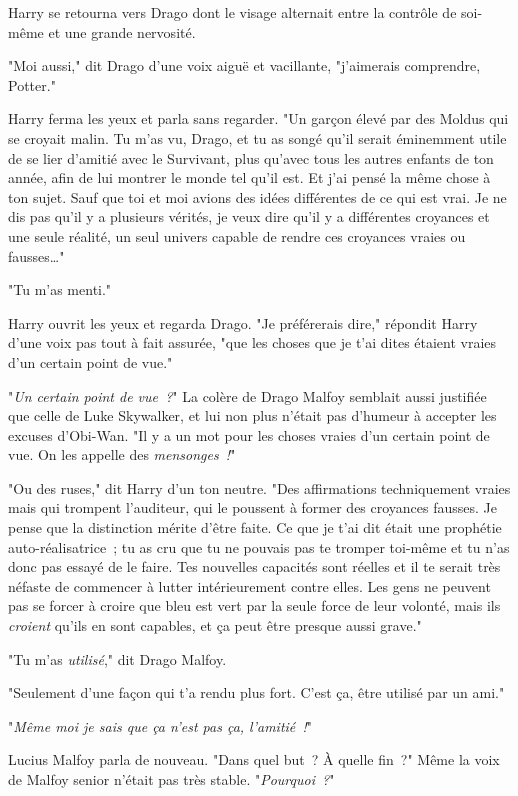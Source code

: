 Harry se retourna vers Drago dont le visage alternait entre la contrôle de soi-même et une grande nervosité.

"Moi aussi," dit Drago d'une voix aiguë et vacillante, "j'aimerais comprendre, Potter."

Harry ferma les yeux et parla sans regarder. "Un garçon élevé par des Moldus qui se croyait malin. Tu m'as vu, Drago, et tu as songé qu'il serait éminemment utile de se lier d'amitié avec le Survivant, plus qu'avec tous les autres enfants de ton année, afin de lui montrer le monde tel qu'il est. Et j'ai pensé la même chose à ton sujet. Sauf que toi et moi avions des idées différentes de ce qui est vrai. Je ne dis pas qu'il y a plusieurs vérités, je veux dire qu'il y a différentes croyances et une seule réalité, un seul univers capable de rendre ces croyances vraies ou fausses…"

"Tu m'as menti."

Harry ouvrit les yeux et regarda Drago. "Je préférerais dire," répondit Harry d'une voix pas tout à fait assurée, "que les choses que je t'ai dites étaient vraies d'un certain point de vue."

"\emph{Un certain point de vue~?}" La colère de Drago Malfoy semblait aussi justifiée que celle de Luke Skywalker, et lui non plus n'était pas d'humeur à accepter les excuses d'Obi-Wan. "Il y a un mot pour les choses vraies d'un certain point de vue. On les appelle des \emph{mensonges~!}"

"Ou des ruses," dit Harry d'un ton neutre. "Des affirmations techniquement vraies mais qui trompent l'auditeur, qui le poussent à former des croyances fausses. Je pense que la distinction mérite d'être faite. Ce que je t'ai dit était une prophétie auto-réalisatrice~; tu as cru que tu ne pouvais pas te tromper toi-même et tu n'as donc pas essayé de le faire. Tes nouvelles capacités sont réelles et il te serait très néfaste de commencer à lutter intérieurement contre elles. Les gens ne peuvent pas se forcer à croire que bleu est vert par la seule force de leur volonté, mais ils \emph{croient} qu'ils en sont capables, et ça peut être presque aussi grave."

"Tu m'as \emph{utilisé}," dit Drago Malfoy.

"Seulement d'une façon qui t'a rendu plus fort. C'est ça, être utilisé par un ami."

"\emph{Même moi je sais que ça n'est pas ça, l'amitié~!}"

Lucius Malfoy parla de nouveau. "Dans quel but~? À quelle fin~?" Même la voix de Malfoy senior n'était pas très stable. "\emph{Pourquoi~?}"

